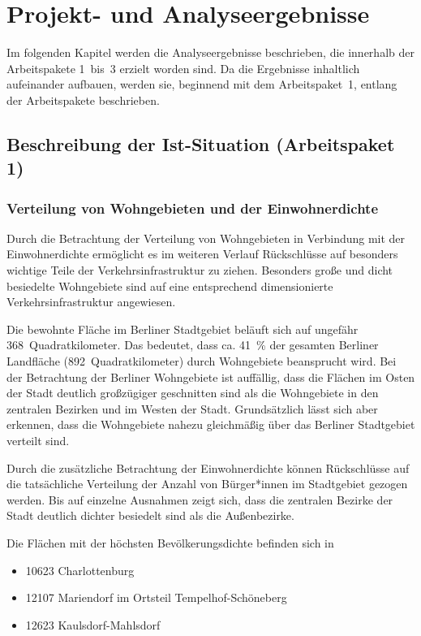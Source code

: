 \newpage
\section{Projekt-  und Analyseergebnisse}
\label{projekt_und_analyseergebnisse}

Im folgenden Kapitel werden die Analyseergebnisse beschrieben, die innerhalb der Arbeitspakete 1~bis~3 erzielt worden sind. Da die Ergebnisse inhaltlich aufeinander aufbauen, werden sie, beginnend mit dem Arbeitspaket~1, entlang der Arbeitspakete beschrieben.

\subsection{Beschreibung der Ist-Situation (Arbeitspaket 1)}
\label{beschreibung_der_ist_situation_arbeitspaket_1}

\subsubsection{Verteilung von Wohngebieten und der Einwohnerdichte}

Durch die Betrachtung der Verteilung von Wohngebieten in Verbindung mit der Einwohnerdichte ermöglicht es im weiteren Verlauf Rückschlüsse auf besonders wichtige Teile der Verkehrsinfrastruktur zu ziehen. Besonders große und dicht besiedelte Wohngebiete sind auf eine entsprechend dimensionierte Verkehrsinfrastruktur angewiesen.

Die bewohnte Fläche im Berliner Stadtgebiet beläuft sich auf ungefähr 368~Quadratkilometer. Das bedeutet, dass ca. 41~\% der gesamten Berliner Landfläche (892~Quadratkilometer) durch Wohngebiete beansprucht wird. Bei der Betrachtung der Berliner Wohngebiete ist auffällig, dass die Flächen im Osten der Stadt deutlich großzügiger geschnitten sind als die Wohngebiete in den zentralen Bezirken und im Westen der Stadt. Grundsätzlich lässt sich aber erkennen, dass die Wohngebiete nahezu gleichmäßig über das Berliner Stadtgebiet verteilt sind.

Durch die zusätzliche Betrachtung der Einwohnerdichte können Rückschlüsse auf die tatsächliche Verteilung der Anzahl von Bürger*innen im Stadtgebiet gezogen werden. Bis auf einzelne Ausnahmen zeigt sich, dass die zentralen Bezirke der Stadt deutlich dichter besiedelt sind als die Außenbezirke.

Die Flächen mit der höchsten Bevölkerungsdichte befinden sich in

\begin{itemize}
    \item 10623 Charlottenburg
    \item 12107 Mariendorf im Ortsteil Tempelhof-Schöneberg
    \item 12623 Kaulsdorf-Mahlsdorf
\end{itemize}

